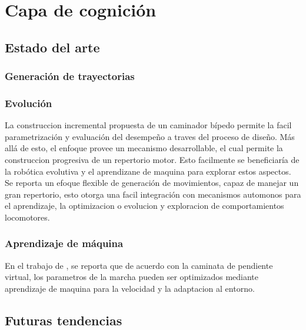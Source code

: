 \documentclass[10pt,onecolumn,twoside,letterpaper]{article}
\begin{document}
\section{Capa de cognici\'on}

\subsection{Estado del arte}
\subsubsection{Generaci\'on de trayectorias}
\subsubsection{Evoluci\'on}
La construccion incremental propuesta de un caminador b\'ipedo permite la facil parametrizaci\'on y evaluaci\'on del desempe\~no a traves del proceso de dise\~no. M\'as all\'a de esto, el enfoque provee un mecanismo desarrollable, el cual permite la construccion progresiva de un repertorio motor. Esto facilmente se beneficiar\'ia de la rob\'otica evolutiva y el aprendizane de maquina para explorar estos aspectos. Se reporta un efoque flexible de generaci\'on de movimientos, capaz de manejar un gran repertorio, esto otorga una facil integraci\'on con mecanismos automonos para el aprendizaje, la optimizacion o evolucion y exploracion de comportamientos locomotores.\cite{Matos2014}\\
\subsubsection{Aprendizaje de m\'aquina}
En el trabajo de \cite{Dong2009}, se reporta que de acuerdo con la caminata de pendiente virtual, los parametros de la marcha pueden ser optimizados mediante aprendizaje de maquina para la velocidad y la adaptacion al entorno.\\
\subsection{Futuras tendencias}
\end{document}
